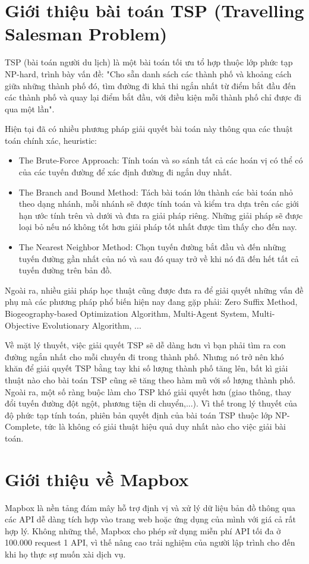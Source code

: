 \section{Giới thiệu bài toán TSP (Travelling Salesman Problem)}
TSP (bài toán người du lịch) là một bài toán tối ưu tổ hợp thuộc lớp phức tạp NP-hard, trình bày vấn đề: "Cho sẵn danh sách các thành phố và khoảng cách giữa những thành phố đó, tìm đường đi khả thi ngắn nhất từ điểm bắt đầu đến các thành phố và quay lại điểm bắt đầu, với điều kiện mỗi thành phố chỉ được đi qua một lần". 

Hiện tại đã có nhiều phương pháp giải quyết bài toán này thông qua các thuật toán chính xác, heuristic:
\begin{itemize}
    \item The Brute-Force Approach: Tính toán và so sánh tất cả các hoán vị có thể có của các tuyến đường để xác định đường đi ngắn duy nhất.
    \item The Branch and Bound Method: Tách bài toán lớn thành các bài toán nhỏ theo dạng nhánh, mỗi nhánh sẽ được tính toán và kiểm tra dựa trên các giới hạn ước tính trên và dưới và đưa ra giải pháp riêng. Những giải pháp sẽ được loại bỏ nếu nó không tốt hơn giải pháp tốt nhất được tìm thấy cho đến nay. 
    \item The Nearest Neighbor Method: Chọn tuyến đường bắt đầu và đến những tuyến đường gần nhất của nó và sau đó quay trở về khi nó đã đến hết tất cả tuyến đường trên bản đồ. 
\end{itemize}
Ngoài ra, nhiều giải pháp học thuật cũng được đưa ra để giải quyết những vấn đề phụ mà các phương pháp phổ biến hiện nay đang gặp phải: Zero Suffix Method, Biogeography-based Optimization Algorithm, Multi-Agent System, Multi-Objective Evolutionary Algorithm, ... 

Về mặt lý thuyết, việc giải quyết TSP sẽ dễ dàng hơn vì bạn phải tìm ra con đường ngắn nhất cho mỗi chuyến đi trong thành phố. Nhưng nó trở nên khó khăn để giải quyết TSP bằng tay khi số lượng thành phố tăng lên, bất kì giải thuật nào cho bài toán TSP cũng sẽ tăng theo hàm mũ với số lượng thành phố. Ngoài ra, một số ràng buộc làm cho TSP khó giải quyết hơn (giao thông, thay đổi tuyến đường đột ngột, phương tiện di chuyển,...). Vì thế trong lý thuyết của độ phức tạp tính toán, phiên bản quyết định của bài toán TSP thuộc lớp NP-Complete, tức là không có giải thuật hiệu quả duy nhất nào cho việc giải bài toán. 

\section{Giới thiệu về Mapbox}
Mapbox là nền tảng đám mây hỗ trợ định vị và xử lý dữ liệu bản đồ thông qua các API dễ dàng tích hợp vào trang web hoặc ứng dụng của mình với giá cả rất hợp lý. Không những thế, Mapbox cho phép sử dụng miễn phí API tối đa ở 100.000 request 1 API, vì thế nâng cao trải nghiệm của người lập trình cho đến khi họ thực sự muốn xài dịch vụ.

